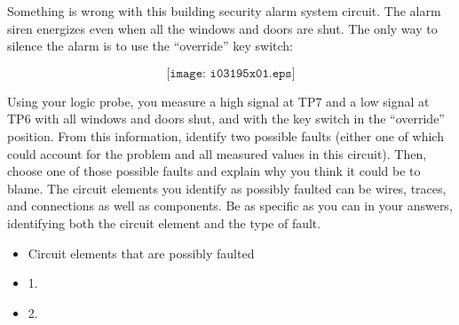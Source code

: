 

Something is wrong with this building security alarm system circuit.  The alarm siren energizes even when all the windows and doors are shut.  The only way to silence the alarm is to use the ``override'' key switch:

$$\texttt{[image: i03195x01.eps]}$$

Using your logic probe, you measure a high signal at TP7 and a low signal at TP6 with all windows and doors shut, and with the key switch in the ``override'' position.  From this information, identify two possible faults (either one of which could account for the problem and all measured values in this circuit).  Then, choose one of those possible faults and explain why you think it could be to blame.  The circuit elements you identify as possibly faulted can be wires, traces, and connections as well as components.  Be as specific as you can in your answers, identifying both the circuit element and the type of fault.

\begin{itemize}
\goodbreak
\item{} Circuit elements that are possibly faulted
\item{1.}
\item{2.} 
\end{itemize}

